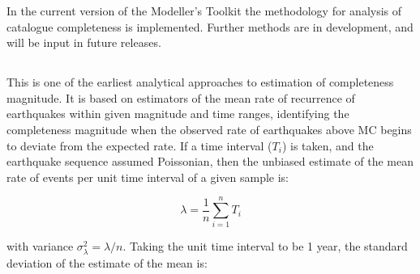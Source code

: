 In the current version of the Modeller's Toolkit the \cite{Stepp1971} methodology for analysis of catalogue completeness is implemented. Further methods are in development, and will be input in future releases.

%
%

\subsection{\cite{Stepp1971}}

This is one of the earliest analytical approaches to estimation of completeness magnitude. It is based on estimators of the mean rate of recurrence of earthquakes within given magnitude and time ranges, identifying the completeness magnitude when the observed rate of earthquakes above MC begins to deviate from the expected rate. If a time interval ($T_i$) is taken, and the earthquake sequence assumed Poissonian, then the unbiased estimate of the mean rate of events per unit time interval of a given sample is:

\begin{equation}
   \lambda = \frac{1}{n} \sum_{i = 1}^{n} T_i
\end{equation}

with variance $\sigma_{\lambda}^{2} = \lambda / n$. Taking the unit time interval to be 1 year, the standard deviation of the estimate of the mean is:

